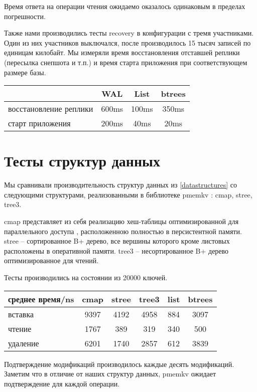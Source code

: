 \documentclass[pdftex,ptm,12pt,a4paper]{report}
\theoremstyle{definition}
\begin{document}
Время ответа на операции чтения ожидаемо оказалось одинаковым в пределах погрешности.

Также нами производились тесты recovery в конфигурации с тремя участниками.
Один из них участников выключался, после производилось 15 тысяч записей по единицам килобайт.
Мы измеряли время восстановления отставшей реплики (пересылка снепшота и т.п.) и время старта приложения при соответствующем размере базы.

\begin{center}
\begin{tabular} {|l |c c c|}
\hline
 & WAL & List & btrees \\
\hline
восстановление реплики & 600ms & 100ms & 350ms \\
старт приложения & 200ms & 40ms & 20ms \\
\hline
\end{tabular}
\end{center}


\section{Тесты структур данных}
\label{pmemkvtests}

Мы сравнивали производительность структур данных из \ref{datastructures} со следующими структурами, реализованными в
библиотеке pmemkv \cite{pmemkv}: cmap, stree, tree3.

cmap представляет из себя реализацию хеш-таблицы оптимизированной для параллельного доступа \cite{malakhov2015perbucket}, расположенною полностью в персистентной памяти.
stree -- сортированное B+ дерево, все вершины которого кроме листовых расположены в оперативной памяти.
tree3 -- несортированное B+ дерево оптимизированное для чтений.

Тесты производились на состоянии из 20000 ключей.

\begin{center}
\begin{tabular} {|l| c c c c c|}
\hline
среднее время/ns & cmap & stree & tree3 & list & btrees \\
\hline
вставка & 9397 & 4192 & 4958 & 884 & 3097 \\
чтение & 1767 & 389 & 319 & 340 & 500 \\
удаление & 6201 & 1740 & 2857 & 612 & 3839 \\
\hline
\end{tabular}
\end{center}

Подтверждение модификаций производилось каждые десять модификаций. Заметим что в отличие от наших структур данных, pmemkv ожидает подтверждение для каждой операции.
\end{document}
